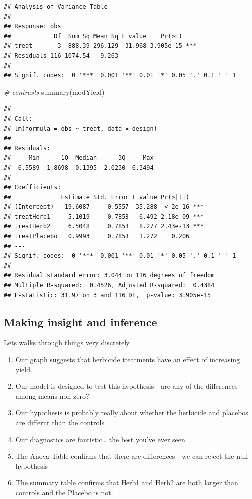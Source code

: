 \documentclass[
]{book}
\newenvironment{Shaded}{\begin{snugshade}}{\end{snugshade}}
\newcommand{\CommentTok}[1]{\textcolor[rgb]{0.56,0.35,0.01}{\textit{#1}}}
\newcommand{\FunctionTok}[1]{\textcolor[rgb]{0.00,0.00,0.00}{#1}}
\newcommand{\NormalTok}[1]{#1}
\providecommand{\tightlist}{%
  \setlength{\itemsep}{0pt}\setlength{\parskip}{0pt}}
\begin{document}
\begin{verbatim}
## Analysis of Variance Table
## 
## Response: obs
##            Df  Sum Sq Mean Sq F value    Pr(>F)    
## treat       3  888.39 296.129  31.968 3.905e-15 ***
## Residuals 116 1074.54   9.263                      
## ---
## Signif. codes:  0 '***' 0.001 '**' 0.01 '*' 0.05 '.' 0.1 ' ' 1
\end{verbatim}

\begin{Shaded}
\begin{Highlighting}[]
\CommentTok{\# contrasts}
\FunctionTok{summary}\NormalTok{(modYield)}
\end{Highlighting}
\end{Shaded}

\begin{verbatim}
## 
## Call:
## lm(formula = obs ~ treat, data = design)
## 
## Residuals:
##     Min      1Q  Median      3Q     Max 
## -6.5589 -1.8698  0.1395  2.0230  6.3494 
## 
## Coefficients:
##              Estimate Std. Error t value Pr(>|t|)    
## (Intercept)   19.6087     0.5557  35.288  < 2e-16 ***
## treatHerb1     5.1019     0.7858   6.492 2.18e-09 ***
## treatHerb2     6.5048     0.7858   8.277 2.43e-13 ***
## treatPlacebo   0.9993     0.7858   1.272    0.206    
## ---
## Signif. codes:  0 '***' 0.001 '**' 0.01 '*' 0.05 '.' 0.1 ' ' 1
## 
## Residual standard error: 3.044 on 116 degrees of freedom
## Multiple R-squared:  0.4526, Adjusted R-squared:  0.4384 
## F-statistic: 31.97 on 3 and 116 DF,  p-value: 3.905e-15
\end{verbatim}

\hypertarget{making-insight-and-inference}{%
\subsection{Making insight and inference}\label{making-insight-and-inference}}

Lets walks through things very discretely.

\begin{enumerate}
\def\labelenumi{\arabic{enumi}.}
\tightlist
\item
  Our graph suggests that herbicide treatments have an effect of increasing yield.
\item
  Our model is designed to test this hypothesis - are any of the differences among means non-zero?
\item
  Our hypothesis is probably really about whether the herbicide and placebos are differnt than the controls
\item
  Our diagnostics are fantistic\ldots{} the best you've ever seen.
\item
  The Anova Table confirms that there are differences - we can reject the null hypothesis
\item
  The summary table confirms that Herb1 and Herb2 are both larger than controls and the Placebo is not.
\end{enumerate}
\end{document}
